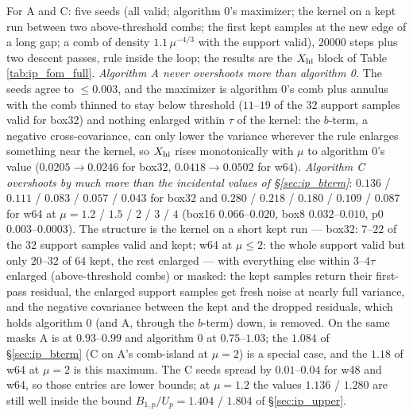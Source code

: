 \documentclass{article}
\numberwithin{equation}{section}   %
\begin{document}
For A and C: five seeds (all valid; algorithm 0's maximizer; the kernel on a kept run between two
above-threshold combs; the first kept samples at the new edge of a long gap; a comb of density
$1.1\,\mu^{-4/3}$ with the support valid), $20000$ steps plus two descent passes, rule inside the loop;
the results are the $X_{\rm hi}$ block of Table \ref{tab:ip_fom_full}.  {\em Algorithm A never overshoots more
than algorithm 0.}  The seeds agree to $\le 0.003$, and the maximizer is algorithm 0's comb plus annulus
with the comb thinned to stay below threshold ($11$--$19$ of the $32$ support samples valid for box32) and
nothing enlarged within $\tau$ of the kernel: the $b$-term, a negative cross-covariance, can only lower
the variance wherever the rule enlarges something near the kernel, so $X_{\rm hi}$ rises monotonically
with $\mu$ to algorithm 0's value ($0.0205 \rightarrow 0.0246$ for box32, $0.0418 \rightarrow 0.0502$ for
w64).  {\em Algorithm C overshoots by much more than the incidental values of \S\ref{sec:ip_bterm}}:
$0.136$ / $0.111$ / $0.083$ / $0.057$ / $0.043$ for box32 and $0.280$ / $0.218$ / $0.180$ / $0.109$ / $0.087$
for w64 at $\mu = 1.2$ / $1.5$ / $2$ / $3$ / $4$ (box16 $0.066$--$0.020$, box8 $0.032$--$0.010$, p0
$0.003$--$0.0003$).  The structure is the kernel on a short kept run --- box32: $7$--$22$ of the $32$
support samples valid and kept; w64 at $\mu \le 2$: the whole support valid but only $20$--$32$ of $64$
kept, the rest enlarged --- with everything else within $3$--$4\tau$ enlarged (above-threshold combs) or
masked: the kept samples return their first-pass residual, the enlarged support samples get fresh noise
at nearly full variance, and the negative covariance between the kept and the dropped residuals, which
holds algorithm 0 (and A, through the $b$-term) down, is removed.  On the same masks A is at
$0.93$--$0.99$ and algorithm 0 at $0.75$--$1.03$; the $1.084$ of \S\ref{sec:ip_bterm} (C on A's comb-island
at $\mu = 2$) is a special case, and the $1.18$ of w64 at $\mu = 2$ is this maximum.  The C seeds spread
by $0.01$--$0.04$ for w48 and w64, so those entries are lower bounds; at $\mu = 1.2$ the values $1.136$ /
$1.280$ are still well inside the bound $B_{1,p}/U_p = 1.404$ / $1.804$ of \S\ref{sec:ip_upper}.
\end{document}
